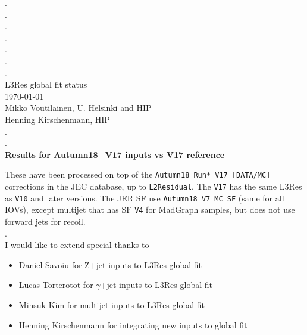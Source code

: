 \documentclass[landscape,10pt]{beamer} %
\begin{document}
\begin{centering}
{. }\\
{. }\\
{. }\\
{. }\\
{. }\\
{. }\\
{. }\\
L3Res global fit status\\
\today\\
Mikko Voutilainen, U. Helsinki and HIP\\
Henning Kirschenmann, HIP\\
{. }\\
{. }\\
{\bf Results for Autumn18\_V17 inputs vs V17 reference}\\
\end{centering}

\newpage

These have been processed on top of the \verb|Autumn18_Run*_V17_[DATA/MC]| corrections in the JEC database, up to \verb|L2Residual|. The \verb|V17| has the same L3Res as \verb|V10| and later versions.
The JER SF use \verb|Autumn18_V7_MC_SF| (same for all IOVs), except multijet that has SF \verb|V4| for MadGraph samples, but does not use forward jets for recoil. \\
.\\
I would like to extend special thanks to
\begin{itemize}
  \item Daniel Savoiu for Z+jet inputs to L3Res global fit
  \item Lucas Torterotot for $\gamma$+jet inputs to L3Res global fit
  \item Minsuk Kim for multijet inputs to L3Res global fit
  \item Henning Kirschenmann for integrating new inputs to global fit
\end{itemize}
\end{document}
